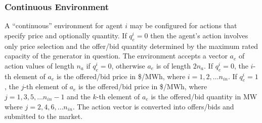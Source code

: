 \subsubsection{Continuous Environment}

A ``continuous'' environment for agent $i$ may be configured for actions that
specify price and optionally quantity.
If $q_e^i = 0$ then the agent's action involves only price selection and the offer/bid quantity determined by the maximum rated capacity of the generator in
question.  The environment accepts a vector $a_e$ of action values of length
$n_a$ if $q_e^i = 0$, otherwise $a_e$ is of length $2n_a$.  If $q_e^i = 0$, the
$i$-th element of $a_e$ is the offered/bid price in \$/MWh, where $i = 1,2,\dotsc
n_{in}$.  If $q_e^i = 1$, the $j$-th element of $a_e$ is the offered/bid
price in \$/MWh, where $j = 1,3,5,\dotsc n_{in}-1$ and the $k$-th element of
$a_e$ is the offered/bid quantity in MW where $j = 2,4,6,\dotsc n_{in}$.  The
action vector is converted into offers/bids and submitted to the market.


